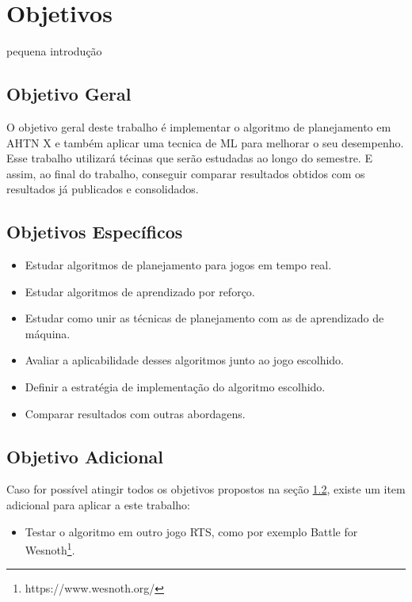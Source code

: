 \chapter{\label{chap:obje}Objetivos}

pequena introdução 

\section{Objetivo Geral}

O objetivo geral deste trabalho é implementar o algoritmo de planejamento em AHTN X e também aplicar uma tecnica de ML para melhorar o seu desempenho. Esse trabalho utilizará técinas que serão estudadas ao longo do semestre. E assim, ao final do trabalho, conseguir comparar resultados obtidos com os resultados já publicados e consolidados.  

\section{Objetivos Específicos}
\label{obj:esp}
\begin{itemize}
\item Estudar algoritmos de planejamento para jogos em tempo real.
\item Estudar algoritmos de aprendizado por reforço.
\item Estudar como unir as técnicas de planejamento com as de aprendizado de máquina.
\item Avaliar a aplicabilidade desses algoritmos junto ao jogo escolhido.
\item Definir a estratégia de implementação do algoritmo escolhido.
\item Comparar resultados com outras abordagens.
\end{itemize}

\section{Objetivo Adicional}

Caso for possível atingir todos os objetivos propostos na seção \ref{obj:esp}, existe um item adicional para aplicar a este trabalho:

\begin{itemize}
\item Testar o algoritmo em outro jogo RTS, como por exemplo Battle for Wesnoth\footnote{https://www.wesnoth.org/}.
\end{itemize}
